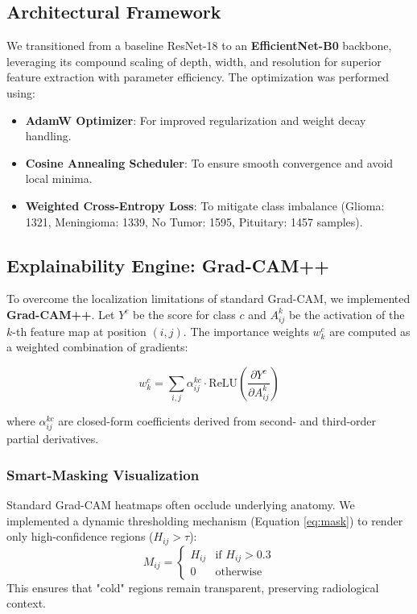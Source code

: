 \documentclass[a4paper,11pt]{article}
\begin{document}
\subsection{Architectural Framework}
We transitioned from a baseline ResNet-18 to an \textbf{EfficientNet-B0} backbone, leveraging its compound scaling of depth, width, and resolution for superior feature extraction with parameter efficiency. The optimization was performed using:
\begin{itemize}
    \item \textbf{AdamW Optimizer}: For improved regularization and weight decay handling.
    \item \textbf{Cosine Annealing Scheduler}: To ensure smooth convergence and avoid local minima.
    \item \textbf{Weighted Cross-Entropy Loss}: To mitigate class imbalance (Glioma: 1321, Meningioma: 1339, No Tumor: 1595, Pituitary: 1457 samples).
\end{itemize}

\subsection{Explainability Engine: Grad-CAM++}
To overcome the localization limitations of standard Grad-CAM, we implemented \textbf{Grad-CAM++}. Let $Y^c$ be the score for class $c$ and $A^k_{ij}$ be the activation of the $k$-th feature map at position $(i,j)$. The importance weights $w_k^c$ are computed as a weighted combination of gradients:

\begin{equation}
w_k^c = \sum_{i,j} \alpha_{ij}^{kc} \cdot \text{ReLU}\left(\frac{\partial Y^c}{\partial A_{ij}^k}\right)
\end{equation}

where $\alpha_{ij}^{kc}$ are closed-form coefficients derived from second- and third-order partial derivatives.

\subsubsection{Smart-Masking Visualization}
Standard Grad-CAM heatmaps often occlude underlying anatomy. We implemented a dynamic thresholding mechanism (Equation \ref{eq:mask}) to render only high-confidence regions ($H_{ij} > \tau$):
\begin{equation}
\label{eq:mask}
M_{ij} = \begin{cases} 
      H_{ij} & \text{if } H_{ij} > 0.3 \\
      0 & \text{otherwise}
   \end{cases}
\end{equation}
This ensures that "cold" regions remain transparent, preserving radiological context.
\end{document}
